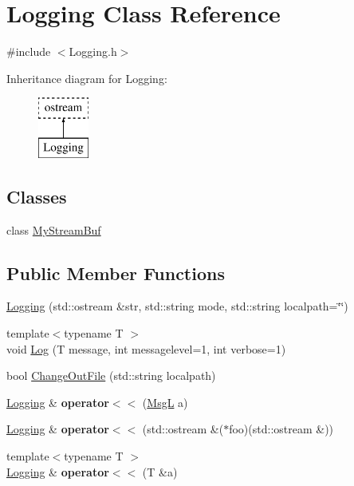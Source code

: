 \hypertarget{classLogging}{\section{Logging Class Reference}
\label{classLogging}
}


{\ttfamily \#include $<$Logging.\-h$>$}

Inheritance diagram for Logging\-:\begin{figure}[H]
\begin{center}
\leavevmode
\includegraphics[height=2.000000cm]{classLogging}
\end{center}
\end{figure}
\subsection*{Classes}
\begin{DoxyCompactItemize}
\item 
class \hyperlink{classLogging_1_1MyStreamBuf}{My\-Stream\-Buf}
\end{DoxyCompactItemize}
\subsection*{Public Member Functions}
\begin{DoxyCompactItemize}
\item 
\hyperlink{classLogging_acdc54e0c7b62f8542ab9508b1df77aa0}{Logging} (std\-::ostream \&str, std\-::string mode, std\-::string localpath=\char`\"{}\char`\"{})
\item 
{\footnotesize template$<$typename T $>$ }\\void \hyperlink{classLogging_af7839ee68729b066da269cc012b1fcc9}{Log} (T message, int messagelevel=1, int verbose=1)
\item 
bool \hyperlink{classLogging_a7a0c89c152ad81fb41a849ed9d81e429}{Change\-Out\-File} (std\-::string localpath)
\item 
\hypertarget{classLogging_aed3d056a85b2bee70f31752595397a60}{\hyperlink{classLogging}{Logging} \& {\bfseries operator$<$$<$} (\hyperlink{structMsgL}{Msg\-L} a)}\label{classLogging_aed3d056a85b2bee70f31752595397a60}

\item 
\hypertarget{classLogging_adcbbc7dc2221a2f5fb88dc68089fb91c}{\hyperlink{classLogging}{Logging} \& {\bfseries operator$<$$<$} (std\-::ostream \&($\ast$foo)(std\-::ostream \&))}\label{classLogging_adcbbc7dc2221a2f5fb88dc68089fb91c}

\item 
\hypertarget{classLogging_a4e1557aba6b12232714eead91264587e}{{\footnotesize template$<$typename T $>$ }\\\hyperlink{classLogging}{Logging} \& {\bfseries operator$<$$<$} (T \&a)}\label{classLogging_a4e1557aba6b12232714eead91264587e}

\end{DoxyCompactItemize}
